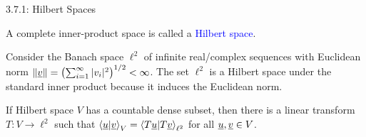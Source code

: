 \documentclass[10pt,letterpaper,english]{beamer}
\begin{document}
\begin{frame}{3.7.1: Hilbert Spaces}

\begin{definition}
A complete inner-product space is called a \textcolor{blue}{Hilbert space}.
\end{definition}

\begin{example}
Consider the Banach space $\ell^2$ of infinite real/complex sequences with Euclidean norm $\|\underline{v}\| = \left( \sum_{i=1}^\infty |v_i|^2 \right)^{1/2} < \infty$.
The set $\ell^2$ is a Hilbert space under the standard inner product because it induces the Euclidean norm.
\end{example}

\begin{theorem} 
If Hilbert space $V$ has a countable dense subset, then there is a linear transform $T:V\to \ell^2$ such that $\left\langle \underline{u} | \underline{v} \right\rangle_V = \left\langle T\underline{u} | T\underline{v} \right\rangle_{\ell^2}$ for all $\underline{u},\underline{v} \in V$.
\end{theorem}


\end{frame}

%
%
\end{document}
